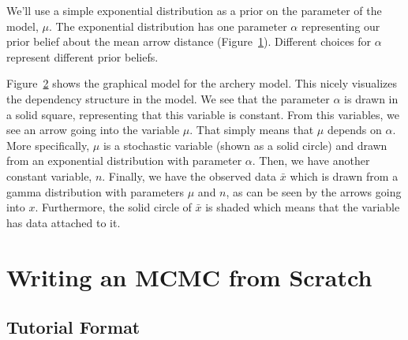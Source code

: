 We'll use a simple exponential distribution as a prior on the parameter of the model, $\mu$.
The exponential distribution has one parameter $\alpha$ representing our prior belief about the mean arrow distance (Figure~\ref{fig:exponential_distribution}).
Different choices for $\alpha$ represent different prior beliefs.
\begin{figure}[h!]
\centering 
{}
\label{fig:exponential_distribution}
\end{figure}

Figure~\ref{fig:archery_model} shows the graphical model for the archery model.
This nicely visualizes the dependency structure in the model.
We see that the parameter $\alpha$ is drawn in a solid square, representing that this variable is constant.
From this variables, we see an arrow going into the variable $\mu$.
That simply means that $\mu$ depends on $\alpha$.
More specifically, $\mu$ is a stochastic variable (shown as a solid circle) and drawn from an exponential distribution with parameter $\alpha$.
Then, we have another constant variable, $n$.
Finally, we have the observed data $\bar x$ which is drawn from a gamma distribution with parameters $\mu$ and $n$, as can be seen by the arrows going into $x$.
Furthermore, the solid circle of $\bar x$ is shaded which means that the variable has data attached to it.
\begin{figure}[h!]
\centering
{}
\label{fig:archery_model}
\end{figure}




\section{Writing an MCMC from Scratch}

\medskip
\subsection{Tutorial Format}\label{subsect:Exercise-Format}

